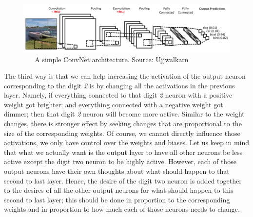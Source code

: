 \documentclass[master]{thesis-uestc}
\begin{document}
\begin{figure}[ht]
\includegraphics[width=5in]{pic/ConvNet_Arch.png}
\caption{\,\,\,\,\,\,\,\,\,\,A simple ConvNet architecture. Source: Ujjwalkarn\cite{intuitiveCNN}}
\label{ConvNet_arch}
\end{figure}

The third way is that we can help increasing the activation of the output neuron corresponding to the digit \textit{2} is by changing all the activations in the previous layer. Namely, if everything connected to that digit \textit{2} neuron with a positive weight got brighter; and everything connected with a negative weight got dimmer; then that digit \textit{2} neuron will become more active. Similar to the weight changes, there is stronger effect by seeking changes that are proportional to the size of the corresponding weights. Of course, we cannot directly influence those activations, we only have control over the weights and biases. Let us keep in mind that what we actually want is the output layer to have all other neurons be less active except the digit two neuron to be highly active. However, each of those output neurons have their own thoughts about what should happen to that second to last layer. Hence, the desire of the digit two neuron is added together to the desires of all the other output neurons for what should happen to this second to last layer; this should be done in proportion to the corresponding weights and in proportion to how much each of those neurons needs to change.
\end{document}
